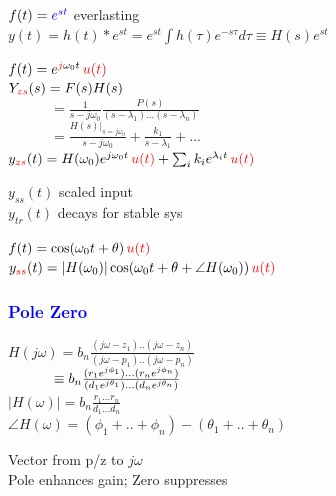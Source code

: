 \documentclass[4pt]{article}
\theoremstyle{definition}
\theoremstyle{definition}
\renewcommand{\o}{\omega}
\newcommand{\red}[1]{\textcolor{red}{#1}}
\newcommand{\blue}[1]{\textcolor{blue}{#1}}
\begin{document}
\begin{landscape}
\begin{multicols}{3}
    \(f(t) = \blue{e^{st}}\) \hfill everlasting\\
    \(y(t) = h(t) * e^{st} = e^{st} \int h(\tau) e^{-s\tau} d\tau \equiv H(s) e^{st}\)

    \(f(t) = e^{\red{j} \o_0 t}\, \red{u(t)}\)\\ 
    \(Y_{\red{zs}}(s) = F(s) H(s)\)\\     
    \(\hspace{3em}= \frac 1 {s - j\o_0} \frac{P(s)}{(s-\lambda_1)...(s-\lambda_n)}\)\\
    \(\hspace{3em}= \frac{H(s)|_{s=j\o_0}}{s-j\o_0} + \frac{k_1}{s-\lambda_1} + ...\)\\
    \(y_{\red{zs}}(t) = H(\o_0)  e^{j\o_0 t} \, \red{u(t)} + \sum_i k_i e^{\lambda_i t} \, \red{u(t)}\)

    $y_{ss}(t)$ scaled input\\
    $y_{tr}(t)$ decays for stable sys

    \(f(t) = \cos(\o_0 t + \theta) \, \red{u(t)}\)\\
    \(y_{\red{ss}}(t) = |H(\o_0)| \cos(\o_0 t + \theta + \angle H(\o_0)) \, \red{u(t)}\)

\subsubsection*{\blue{Pole Zero}}
    \(H(j\o) = b_n \frac{(j\o-z_1)..(j\o-z_n)}{(j\o-p_1)..(j\o-p_n)}\)\\\
    \(\hspace{2.75em} \equiv b_n \frac{(r_1 e^{j\phi_1})...(r_n e^{j\phi_n})}{(d_1 e^{j\theta_1})... (d_n e^{j\theta_n})}\)\\
    \(|H(\o)| = b_n \frac{r_1 ... r_n}{d_1 ... d_n}\)\\
    \(\angle H(\o) = (\phi_1 + .. + \phi_n) - (\theta_1 + .. + \theta_n)\)          %

    Vector from p/z to $j\o$\\
    Pole enhances gain; Zero suppresses
\end{multicols}
\end{landscape}
\end{document}
